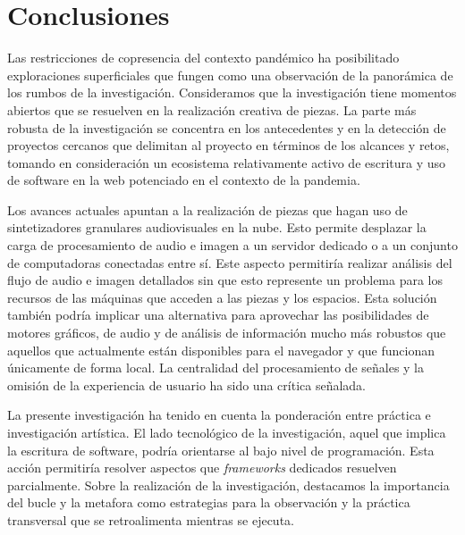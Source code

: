 \section*{Conclusiones}

Las restricciones de copresencia del contexto pandémico ha posibilitado exploraciones superficiales que fungen como una observación de la panorámica de los rumbos de la investigación. Consideramos que la investigación tiene momentos abiertos que se resuelven en la realización creativa de piezas. La parte más robusta de la investigación se concentra en los antecedentes y en la detección de proyectos cercanos que delimitan al proyecto en términos de los alcances y retos, tomando en consideración un ecosistema relativamente activo de escritura y uso de software en la web potenciado en el contexto de la pandemia. 

Los avances actuales apuntan a la realización de piezas que hagan uso de sintetizadores granulares audiovisuales en la nube. Esto permite desplazar la carga de procesamiento de audio e imagen a un servidor dedicado o a un conjunto de computadoras conectadas entre sí. Este aspecto permitiría realizar análisis del flujo de audio e imagen detallados sin que esto represente un problema para los recursos de las máquinas que acceden a las piezas y los espacios. Esta solución también podría implicar una alternativa para aprovechar las posibilidades de motores gráficos, de audio y de análisis de información mucho más robustos que aquellos que actualmente están disponibles para el navegador y que funcionan únicamente de forma local. La centralidad del procesamiento de señales y la omisión de la experiencia de usuario ha sido una crítica señalada. 


La presente investigación ha tenido en cuenta la ponderación entre práctica e investigación artística. El lado tecnológico de la investigación, aquel que implica la escritura de software, podría orientarse al bajo nivel de programación. Esta acción permitiría resolver aspectos que \textit{frameworks} dedicados resuelven parcialmente. Sobre la realización de la investigación, destacamos la importancia del bucle y la metafora como estrategias para la observación y la práctica transversal que se retroalimenta mientras se ejecuta. 

